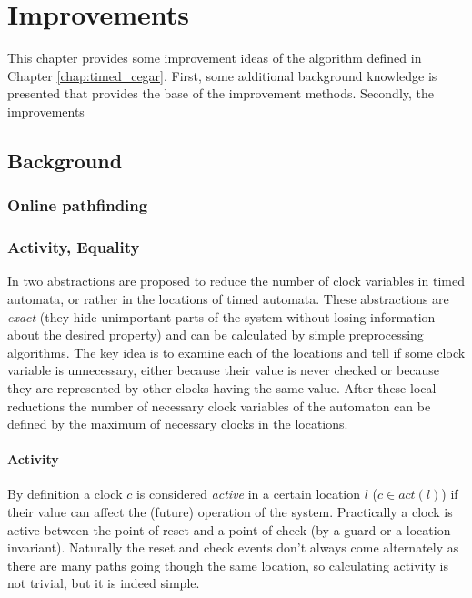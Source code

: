 \chapter{Improvements}


This chapter provides some improvement ideas of the algorithm defined in Chapter \ref{chap:timed_cegar}. First, some additional background knowledge is presented that provides the base of the improvement methods. Secondly, the improvements

\section{Background}


\subsection{Online pathfinding}
\subsection{Activity, Equality} %

In \cite{RSS96*73} two abstractions are proposed to reduce the number of clock variables in timed automata, or rather in the locations of timed automata. These abstractions are \emph{exact} (they hide unimportant parts of the system without losing information about the desired property) and can be calculated by simple preprocessing algorithms. The key idea is to examine each of the locations and tell if some clock variable is unnecessary, either because their value is never checked or because they are represented by other clocks having the same value. After these local reductions the number of necessary clock variables of the automaton can be defined by the maximum of necessary clocks in the locations.

\subsubsection{Activity}

By definition a clock $c$ is considered \emph{active} in a certain location $l$ ($c \in act(l)$) if their value can affect the (future) operation of the system. Practically a clock is active between the point of reset and a point of check (by a guard or a location invariant). Naturally the reset and check events don't always come alternately as there are many paths going though the same location, so calculating activity is not trivial, but it is indeed simple.
 
